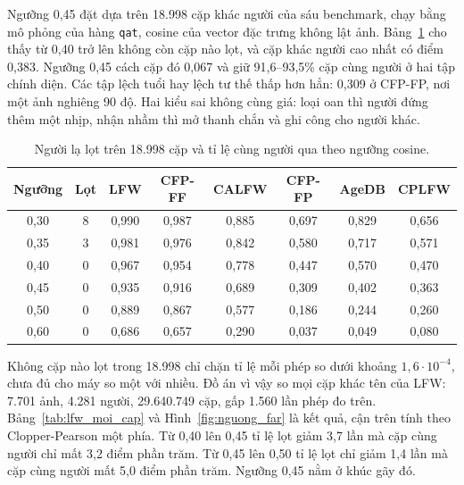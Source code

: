\documentclass[../DoAn.tex]{subfiles}
\begin{document}
Ngưỡng 0,45 đặt dựa trên 18.998 cặp khác người của sáu benchmark, chạy bằng mô phỏng của hàng \texttt{qat}, cosine của vector đặc trưng
không lật ảnh. Bảng~\ref{tab:nguong_khop} cho thấy từ 0,40 trở lên không còn cặp nào lọt, và cặp khác người cao nhất có điểm 0,383. Ngưỡng
0,45 cách cặp đó 0,067 và giữ 91,6--93,5\% cặp cùng người ở hai tập chính diện. Các tập lệch tuổi hay lệch tư thế thấp hơn hẳn: 0,309 ở
CFP-FP, nơi một ảnh nghiêng 90 độ. Hai kiểu sai không cùng giá: loại oan thì người đứng thêm một nhịp, nhận nhầm thì mở thanh chắn và ghi
công cho người khác.

\begin{table}[!htb]
\centering
\small
\caption{Người lạ lọt trên 18.998 cặp và tỉ lệ cùng người qua theo ngưỡng cosine.}
\label{tab:nguong_khop}
\begin{tabular}{|c|c|c|c|c|c|c|c|}
\hline
\textbf{Ngưỡng} & \textbf{Lọt} & \textbf{LFW} & \textbf{CFP-FF} & \textbf{CALFW} & \textbf{CFP-FP} & \textbf{AgeDB} & \textbf{CPLFW} \\
\hline
0,30 & 8 & 0,990 & 0,987 & 0,885 & 0,697 & 0,829 & 0,656 \\
\hline
0,35 & 3 & 0,981 & 0,976 & 0,842 & 0,580 & 0,717 & 0,571 \\
\hline
0,40 & 0 & 0,967 & 0,954 & 0,778 & 0,447 & 0,570 & 0,470 \\
\hline
0,45 & 0 & 0,935 & 0,916 & 0,689 & 0,309 & 0,402 & 0,363 \\
\hline
0,50 & 0 & 0,889 & 0,867 & 0,577 & 0,186 & 0,244 & 0,260 \\
\hline
0,60 & 0 & 0,686 & 0,657 & 0,290 & 0,037 & 0,049 & 0,080 \\
\hline
\end{tabular}
\end{table}

Không cặp nào lọt trong 18.998 chỉ chặn tỉ lệ mỗi phép so dưới khoảng $1{,}6\cdot10^{-4}$, chưa đủ cho máy so một với nhiều. Đồ án vì vậy so
mọi cặp khác tên của LFW: 7.701 ảnh, 4.281 người, 29.640.749 cặp, gấp 1.560 lần phép đo trên. Bảng~\ref{tab:lfw_moi_cap} và
Hình~\ref{fig:nguong_far} là kết quả, cận trên tính theo Clopper-Pearson một phía. Từ 0,40 lên 0,45 tỉ lệ lọt giảm 3,7 lần mà cặp cùng người
chỉ mất 3,2 điểm phần trăm. Từ 0,45 lên 0,50 tỉ lệ lọt chỉ giảm 1,4 lần mà cặp cùng người mất 5,0 điểm phần trăm. Ngưỡng 0,45 nằm ở
khúc gãy đó.
\end{document}
